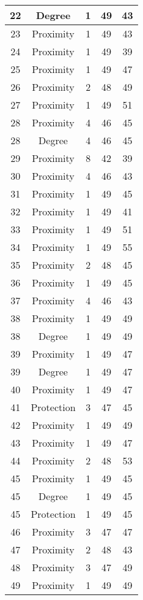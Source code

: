 \documentclass[results.tex]{subfiles}
\begin{document}
\begin{center}
\begin{tabular}{| c || c | c | c | c |}
    \hline
    22 & Degree & 1 & 49 & 43 \\ 
    \hline
    23 & Proximity & 1 & 49 & 43 \\ 
    \hline
    24 & Proximity & 1 & 49 & 39 \\ 
    \hline
    25 & Proximity & 1 & 49 & 47 \\ 
    \hline
    26 & Proximity & 2 & 48 & 49 \\ 
    \hline
    27 & Proximity & 1 & 49 & 51 \\ 
    \hline
    28 & Proximity & 4 & 46 & 45 \\ 
    \hline
    28 & Degree & 4 & 46 & 45 \\ 
    \hline
    29 & Proximity & 8 & 42 & 39 \\ 
    \hline
    30 & Proximity & 4 & 46 & 43 \\ 
    \hline
    31 & Proximity & 1 & 49 & 45 \\ 
    \hline
    32 & Proximity & 1 & 49 & 41 \\ 
    \hline
    33 & Proximity & 1 & 49 & 51 \\ 
    \hline
    34 & Proximity & 1 & 49 & 55 \\ 
    \hline
    35 & Proximity & 2 & 48 & 45 \\ 
    \hline
    36 & Proximity & 1 & 49 & 45 \\ 
    \hline
    37 & Proximity & 4 & 46 & 43 \\ 
    \hline
    38 & Proximity & 1 & 49 & 49 \\ 
    \hline
    38 & Degree & 1 & 49 & 49 \\ 
    \hline
    39 & Proximity & 1 & 49 & 47 \\ 
    \hline
    39 & Degree & 1 & 49 & 47 \\ 
    \hline
    40 & Proximity & 1 & 49 & 47 \\ 
    \hline
    41 & Protection & 3 & 47 & 45 \\ 
    \hline
    42 & Proximity & 1 & 49 & 49 \\ 
    \hline
    43 & Proximity & 1 & 49 & 47 \\ 
    \hline
    44 & Proximity & 2 & 48 & 53 \\ 
    \hline
    45 & Proximity & 1 & 49 & 45 \\ 
    \hline
    45 & Degree & 1 & 49 & 45 \\ 
    \hline
    45 & Protection & 1 & 49 & 45 \\ 
    \hline
    46 & Proximity & 3 & 47 & 47 \\ 
    \hline
    47 & Proximity & 2 & 48 & 43 \\ 
    \hline
    48 & Proximity & 3 & 47 & 49 \\ 
    \hline
    49 & Proximity & 1 & 49 & 49 \\ 
    \hline   \end{tabular}
\end{center}
\end{document}
